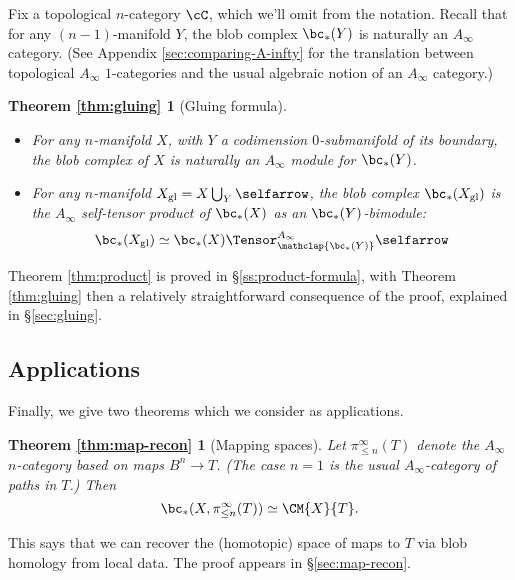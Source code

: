 Fix a topological $n$-category $\cC$, which we'll omit from the notation.
Recall that for any $(n-1)$-manifold $Y$, the blob complex $\bc_*(Y)$ is naturally an $A_\infty$ category.
(See Appendix \ref{sec:comparing-A-infty} for the translation between topological $A_\infty$ $1$-categories and the usual algebraic notion of an $A_\infty$ category.)

\newtheorem*{thm:gluing}{Theorem \ref{thm:gluing}}

\begin{thm:gluing}[Gluing formula]
\mbox{}%
\begin{itemize}
\item For any $n$-manifold $X$, with $Y$ a codimension $0$-submanifold of its boundary, the blob complex of $X$ is naturally an
$A_\infty$ module for $\bc_*(Y)$.

\item For any $n$-manifold $X_\text{gl} = X\bigcup_Y \selfarrow$, the blob complex $\bc_*(X_\text{gl})$ is the $A_\infty$ self-tensor product of
$\bc_*(X)$ as an $\bc_*(Y)$-bimodule:
\begin{equation*}
\bc_*(X_\text{gl}) \simeq \bc_*(X) \Tensor^{A_\infty}_{\mathclap{\bc_*(Y)}} \selfarrow
\end{equation*}
\end{itemize}
\end{thm:gluing}

Theorem \ref{thm:product} is proved in \S \ref{ss:product-formula}, with Theorem \ref{thm:gluing} then a relatively straightforward consequence of the proof, explained in \S \ref{sec:gluing}.

\subsection{Applications}
\label{sec:applications}
Finally, we give two theorems which we consider as applications.

\newtheorem*{thm:map-recon}{Theorem \ref{thm:map-recon}}

\begin{thm:map-recon}[Mapping spaces]
Let $\pi^\infty_{\le n}(T)$ denote the $A_\infty$ $n$-category based on maps 
$B^n \to T$.
(The case $n=1$ is the usual $A_\infty$-category of paths in $T$.)
Then 
$$\bc_*(X, \pi^\infty_{\le n}(T)) \simeq \CM{X}{T}.$$
\end{thm:map-recon}

This says that we can recover the (homotopic) space of maps to $T$ via blob homology from local data. The proof appears in \S \ref{sec:map-recon}.

